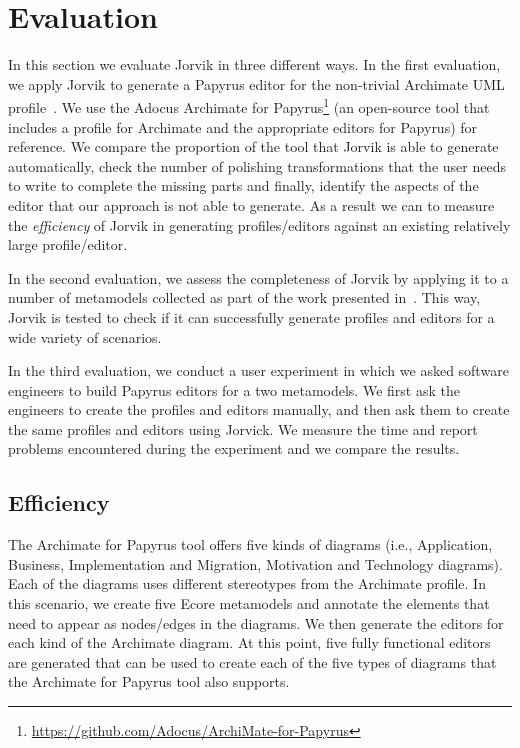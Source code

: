 \section{Evaluation}
\label{sec:evaluation}

In this section we evaluate Jorvik in three different ways. 
In the first evaluation, we apply Jorvik to generate a Papyrus editor for the non-trivial Archimate UML profile~\cite{iacob2009archimate,haren2012archimate}. 
We use the Adocus Archimate for Papyrus\footnote{\url{https://github.com/Adocus/ArchiMate-for-Papyrus}} (an open-source tool that includes a profile for Archimate and the appropriate editors for Papyrus) for reference. 
We compare the proportion of the tool that Jorvik is able to generate automatically, check the number of polishing transformations that the user needs to write to complete the missing parts and finally, identify the aspects of the editor that our approach is not able to generate.
As a result we can to measure the \textit{efficiency} of Jorvik in generating profiles/editors against an existing relatively large profile/editor. 

In the second evaluation, we assess the completeness of Jorvik by applying it to a number of metamodels collected as part of the work presented in~\cite{williams2013metamodels}. 
This way, Jorvik is tested to check if it can successfully generate profiles and editors for a wide variety of scenarios.

In the third evaluation, we conduct a user experiment in which we asked software engineers to build Papyrus editors for a two metamodels. 
We first ask the engineers to create the profiles and editors manually, and then ask them to create the same profiles and editors using Jorvick. 
We measure the time and report problems encountered during the experiment and we compare the results.

\subsection{Efficiency}
\label{sec:efficiencyEvaluation}
The Archimate for Papyrus tool offers five kinds of diagrams (i.e., Application, Business, Implementation and Migration, Motivation and Technology diagrams). 
Each of the diagrams uses different stereotypes from the Archimate profile. 
In this scenario, we create five Ecore metamodels and annotate the elements that need to appear as nodes/edges in the diagrams. 
We then generate the editors for each kind of the Archimate diagram.
At this point, five fully functional editors are generated that can be used to create each of the five types of diagrams that the Archimate for Papyrus tool also supports. 


